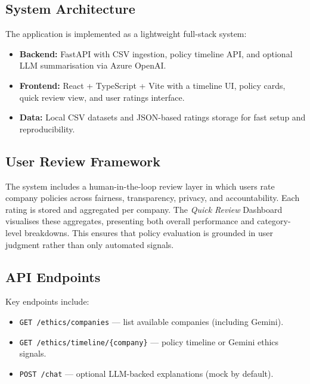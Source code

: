 \documentclass[conference]{IEEEtran}
\begin{document}
\subsection*{System Architecture}
The application is implemented as a lightweight full-stack system:

\begin{itemize}
  \item \textbf{Backend:} FastAPI with CSV ingestion, policy timeline API, and
  optional LLM summarisation via Azure OpenAI.
  \item \textbf{Frontend:} React + TypeScript + Vite with a timeline UI,
  policy cards, quick review view, and user ratings interface.
  \item \textbf{Data:} Local CSV datasets and JSON-based ratings storage for
  fast setup and reproducibility.
\end{itemize}

\subsection*{User Review Framework}
The system includes a human-in-the-loop review layer in which users rate
company policies across fairness, transparency, privacy, and accountability.
Each rating is stored and aggregated per company. The \emph{Quick Review}
Dashboard visualises these aggregates, presenting both overall performance
and category-level breakdowns. This ensures that policy evaluation is grounded
in user judgment rather than only automated signals.

\subsection*{API Endpoints}
Key endpoints include:
\begin{itemize}
  \item \texttt{GET /ethics/companies} --- list available companies (including
  Gemini).
  \item \texttt{GET /ethics/timeline/\{company\}} --- policy timeline or Gemini
  ethics signals.
  \item \texttt{POST /chat} --- optional LLM-backed explanations (mock by
  default).
\end{itemize}
\end{document}
